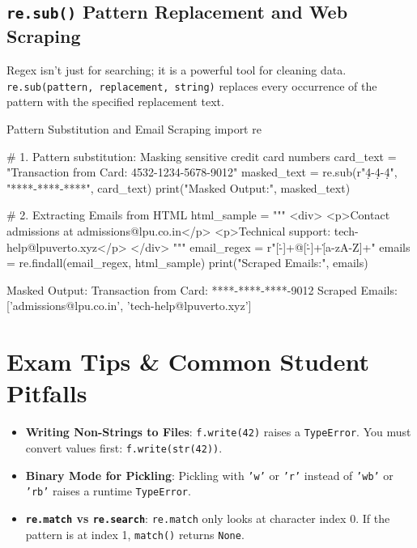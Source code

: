 \subsection{\texttt{re.sub()} Pattern Replacement and Web Scraping}

Regex isn't just for searching; it is a powerful tool for cleaning data. \texttt{re.sub(pattern, replacement, string)} replaces every occurrence of the pattern with the specified replacement text.

\begin{pythoncode}{Pattern Substitution and Email Scraping}
import re

# 1. Pattern substitution: Masking sensitive credit card numbers
card_text = "Transaction from Card: 4532-1234-5678-9012"
masked_text = re.sub(r"\d{4}-\d{4}-\d{4}", "****-****-****", card_text)
print("Masked Output:", masked_text)

# 2. Extracting Emails from HTML
html_sample = """
<div>
    <p>Contact admissions at admissions@lpu.co.in</p>
    <p>Technical support: tech-help@lpuverto.xyz</p>
</div>
"""
email_regex = r"[\w\.-]+@[\w\.-]+\.[a-zA-Z]+"
emails = re.findall(email_regex, html_sample)
print("Scraped Emails:", emails)
\end{pythoncode}
\begin{outputbox}
Masked Output: Transaction from Card: ****-****-****-9012
Scraped Emails: ['admissions@lpu.co.in', 'tech-help@lpuverto.xyz']
\end{outputbox}

\section{Exam Tips \& Common Student Pitfalls}

\begin{examtip}
\begin{itemize}[leftmargin=1.5em]
    \item \textbf{Writing Non-Strings to Files}: \texttt{f.write(42)} raises a \texttt{TypeError}. You must convert values first: \texttt{f.write(str(42))}.
    \item \textbf{Binary Mode for Pickling}: Pickling with \texttt{'w'} or \texttt{'r'} instead of \texttt{'wb'} or \texttt{'rb'} raises a runtime \texttt{TypeError}.
    \item \textbf{\texttt{re.match} vs \texttt{re.search}}: \texttt{re.match} only looks at character index 0. If the pattern is at index 1, \texttt{match()} returns \texttt{None}.
\end{itemize}
\end{examtip}

